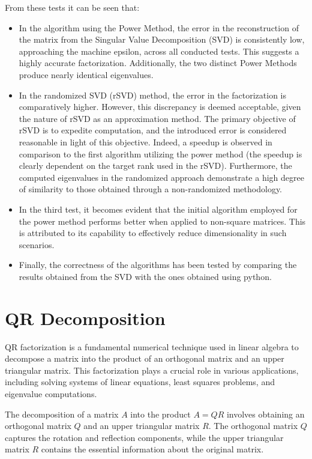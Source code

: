 \documentclass{article}
\begin{document}
From these tests it can be seen that:
\begin{itemize}
\item In the algorithm using the Power Method, the error in the reconstruction of the matrix from the Singular Value Decomposition (SVD) is consistently low, approaching the machine epsilon, across all conducted tests. This suggests a highly accurate factorization. Additionally, the two distinct Power Methods produce nearly identical eigenvalues.

\item In the randomized SVD (rSVD) method, the error in the factorization is comparatively higher. However, this discrepancy is deemed acceptable, given the nature of rSVD as an approximation method. The primary objective of rSVD is to expedite computation, and the introduced error is considered reasonable in light of this objective. Indeed, a speedup is observed in comparison to the first algorithm utilizing the power method (the speedup is clearly dependent on the target rank used in the rSVD). Furthermore, the computed eigenvalues in the randomized approach demonstrate a high degree of similarity to those obtained through a non-randomized methodology.

\item In the third test, it becomes evident that the initial algorithm employed for the power method performs better when applied to non-square matrices. This is attributed to its capability to effectively reduce dimensionality in such scenarios.

\item Finally, the correctness of the algorithms has been tested by comparing the results obtained from the SVD with the ones obtained using python.

\end{itemize}



\section{QR Decomposition}

QR factorization is a fundamental numerical technique used in linear algebra to decompose a matrix into the product of an orthogonal matrix and an upper triangular matrix. This factorization plays a crucial role in various applications, including solving systems of linear equations, least squares problems, and eigenvalue computations.

The decomposition of a matrix $A$ into the product $A = QR$ involves obtaining an orthogonal matrix $Q$ and an upper triangular matrix $R$. The orthogonal matrix $Q$ captures the rotation and reflection components, while the upper triangular matrix $R$ contains the essential information about the original matrix.
\end{document}
